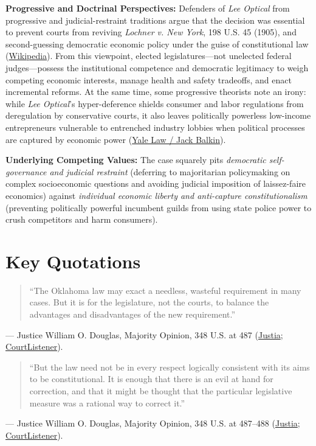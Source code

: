 \documentclass[12pt]{article}
\begin{document}
\textbf{Progressive and Doctrinal Perspectives:} Defenders of \textit{Lee Optical} from progressive and judicial-restraint traditions argue that the decision was essential to prevent courts from reviving \textit{Lochner v. New York}, 198 U.S. 45 (1905), and second-guessing democratic economic policy under the guise of constitutional law (\href{https://en.wikipedia.org/wiki/Lochner_v._New_York}{Wikipedia}). From this viewpoint, elected legislatures---not unelected federal judges---possess the institutional competence and democratic legitimacy to weigh competing economic interests, manage health and safety tradeoffs, and enact incremental reforms. At the same time, some progressive theorists note an irony: while \textit{Lee Optical}'s hyper-deference shields consumer and labor regulations from deregulation by conservative courts, it also leaves politically powerless low-income entrepreneurs vulnerable to entrenched industry lobbies when political processes are captured by economic power (\href{https://jackbalkin.yale.edu/footnote-part-iii}{Yale Law / Jack Balkin}).

\textbf{Underlying Competing Values:} The case squarely pits \textit{democratic self-governance and judicial restraint} (deferring to majoritarian policymaking on complex socioeconomic questions and avoiding judicial imposition of laissez-faire economics) against \textit{individual economic liberty and anti-capture constitutionalism} (preventing politically powerful incumbent guilds from using state police power to crush competitors and harm consumers).

\section{Key Quotations}

\begin{quote}
``The Oklahoma law may exact a needless, wasteful requirement in many cases. But it is for the legislature, not the courts, to balance the advantages and disadvantages of the new requirement.''
\end{quote}
\noindent --- Justice William O. Douglas, Majority Opinion, 348 U.S. at 487 (\href{https://supreme.justia.com/cases/federal/us/348/483/}{Justia}; \href{https://www.courtlistener.com/opinion/105285/williamson-v-lee-optical-of-oklahoma-inc/}{CourtListener}).

\begin{quote}
``But the law need not be in every respect logically consistent with its aims to be constitutional. It is enough that there is an evil at hand for correction, and that it might be thought that the particular legislative measure was a rational way to correct it.''
\end{quote}
\noindent --- Justice William O. Douglas, Majority Opinion, 348 U.S. at 487--488 (\href{https://supreme.justia.com/cases/federal/us/348/483/}{Justia}; \href{https://www.courtlistener.com/opinion/105285/williamson-v-lee-optical-of-oklahoma-inc/}{CourtListener}).
\end{document}
